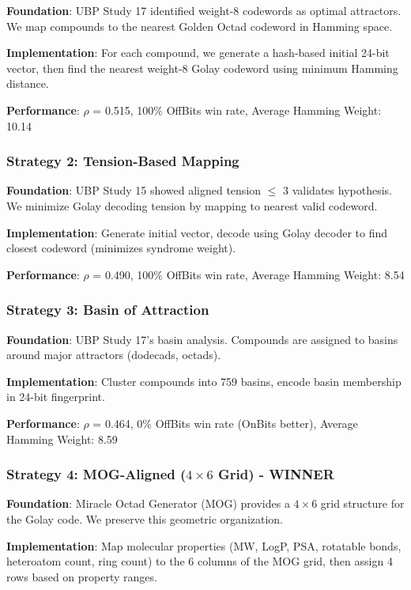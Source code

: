 \documentclass[11pt,letterpaper]{article}
\begin{document}
\textbf{Foundation}: UBP Study 17 identified weight-8 codewords as optimal attractors. We map compounds to the nearest Golden Octad codeword in Hamming space.

\textbf{Implementation}: For each compound, we generate a hash-based initial 24-bit vector, then find the nearest weight-8 Golay codeword using minimum Hamming distance.

\textbf{Performance}: $\rho$ = 0.515, 100\% OffBits win rate, Average Hamming Weight: 10.14

\subsubsection{Strategy 2: Tension-Based Mapping}

\textbf{Foundation}: UBP Study 15 showed aligned tension $\leq$ 3 validates hypothesis. We minimize Golay decoding tension by mapping to nearest valid codeword.

\textbf{Implementation}: Generate initial vector, decode using Golay decoder to find closest codeword (minimizes syndrome weight).

\textbf{Performance}: $\rho$ = 0.490, 100\% OffBits win rate, Average Hamming Weight: 8.54

\subsubsection{Strategy 3: Basin of Attraction}

\textbf{Foundation}: UBP Study 17's basin analysis. Compounds are assigned to basins around major attractors (dodecads, octads).

\textbf{Implementation}: Cluster compounds into 759 basins, encode basin membership in 24-bit fingerprint.

\textbf{Performance}: $\rho$ = 0.464, 0\% OffBits win rate (OnBits better), Average Hamming Weight: 8.59

\subsubsection{Strategy 4: MOG-Aligned ($4\times6$ Grid) - WINNER}

\textbf{Foundation}: Miracle Octad Generator (MOG) provides a $4\times6$ grid structure for the Golay code. We preserve this geometric organization.

\textbf{Implementation}: Map molecular properties (MW, LogP, PSA, rotatable bonds, heteroatom count, ring count) to the 6 columns of the MOG grid, then assign 4 rows based on property ranges.
\end{document}
